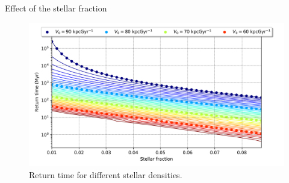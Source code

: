 \documentclass{beamer}
\begin{document}
%
%

\begin{frame}{Effect of the stellar fraction}
	\begin{figure}[h]
		\centering
		\includegraphics[width=0.9\linewidth]{"../Files/Week 10/returntimes_stellar_speed"}
		\caption{Return time for different stellar densities.}
	\end{figure}
\end{frame}
\end{document}
